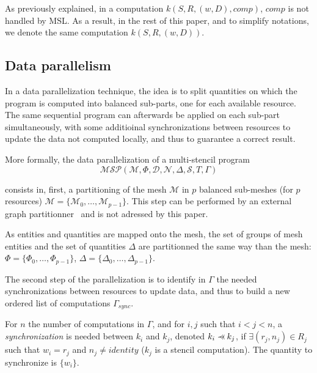 
As previously explained, in a computation $k(S,R,(w,D),comp)$, $comp$ is not handled by MSL. As a result, in the rest of this paper, and to simplify notations, we denote the same computation $k(S,R,(w,D))$.

\subsection{Data parallelism}
\label{sect:dataparal}
In a data parallelization technique, the idea is to split quantities on which the program is computed into balanced sub-parts, one for each available resource. The same sequential program can afterwards be applied on each sub-part simultaneously, with some additioinal synchronizations between resources to update the data not computed locally, and thus to guarantee a correct result.

\medskip
More formally, the data parallelization of a multi-stencil program 
\begin{equation*}
\mathcal{MSP}(\mathcal{M},\Phi,\mathcal{D},\mathcal{N},\Delta, \mathcal{S},T,\Gamma)
\end{equation*}

consists in, first, a partitioning of the mesh $\mathcal{M}$ in $p$ balanced sub-meshes (for $p$ resources) $\mathcal{M}=\{\mathcal{M}_0,\dots,\mathcal{M}_{p-1}\}$. This step can be performed by an external graph partitionner~\cite{Pellegrini:1996:SSP:645560.658570,DBLP:conf/ieeehpcs/HeleneS13,lachat:hal-00768916} and is not adressed by this paper. 

As entities and quantities are mapped onto the mesh, the set of groups of mesh entities and the set of quantities $\Delta$ are partitionned the same way than the mesh: $\Phi=\{\Phi_0,\dots,\Phi_{p-1}\}$, $\Delta=\{\Delta_0,\dots,\Delta_{p-1}\}$. 

The second step of the parallelization is to identify in $\Gamma$ the needed synchronizations between resources to update data, and thus to build a new ordered list of computations $\Gamma_{sync}$.

\begin{mydef}
For $n$ the number of computations in $\Gamma$, and for $i,j$ such that $i<j<n$, a \textit{synchronization} is needed between $k_i$ and $k_j$, denoted $k_i \pprec k_j$, if $\exists (r_j,n_j) \in R_j$ such that $w_i=r_j$ and $n_j\neq identity$ ($k_j$ is a stencil computation). The quantity to synchronize is $\{w_i\}$.
\label{def:sync}
\end{mydef}

